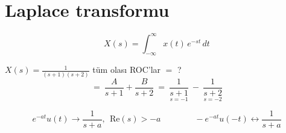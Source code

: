\documentclass[11pt,a4paper]{article}
\begin{document}

\nopagebreak
\section{Laplace transformu}
\[ X(s)=\int_{-\infty}^{\infty} x(t)\,e^{-st}\,dt \]

\begin{ornek}
  $\displaystyle X(s)=\frac{1}{(s+1)(s+2)}$ \qquad tüm olası ROC'lar $=$ ?
  \[ =\ \frac{A}{s+1}+\frac{B}{s+2}\ =\ \underset{\scriptstyle s=-1}{\frac{1}{s+1}}\ -\ \underset{\scriptstyle s=-2}{\frac{1}{s+2}} \]
\end{ornek}

\[ e^{-at}u(t)\to\frac{1}{s+a},\ \ \mathrm{Re}(s)>-a \qquad\qquad -e^{-at}u(-t)\leftrightarrow\frac{1}{s+a} \]
\end{document}
